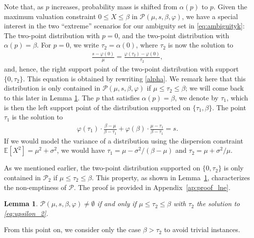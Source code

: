 \documentclass[11pt]{article}
\newtheorem{lemma}{Lemma}[section]
\newcommand{\cP}{\mathcal{P}}
\newcommand{\cPpar}{\mathcal{P}(\mu,s,\beta,\varphi)}
\newcommand{\1}{\mathds{1}}
\begin{document}
Note that, as $p$ increases, probability mass is shifted from $\alpha(p)$ to $p$.
Given the maximum valuation constraint $0 \leq X \leq \beta$ in $\cPpar$, we have a special interest in the two ``extreme''  scenarios for our ambiguity set in \eqref{eq:ambiguityk}: The two-point distribution with $p = 0$, and the two-point distribution with $\alpha(p) = \beta$.
For $p = 0$, we write $\tau_2 = \alpha(0)$, where $\tau_2$ is now the solution to 
\begin{align}
        \frac{s- \varphi(0)}{\mu} = \frac{\varphi(\tau_2)-\varphi(0)}{\tau_2},
        \label{eq:upsilon_2}
\end{align}
and, hence, the right support point of the two-point distribution with support $\{0,\tau_2\}$. This equation is obtained by rewriting \eqref{alpha}. We remark here that this distribution is only contained in $\cPpar$ if $\mu \leq \tau_2 \leq \beta$; we will come back to this later in Lemma \ref{lemma:non-empty}. The $p$ that satisfies $\alpha(p) = \beta$, we denote by $\tau_1$, which is then the left support point of the distribution supported on $\{\tau_1,\beta\}$. The point $\tau_1$ is the solution to
\begin{align}
    \varphi(\tau_1)\cdot \frac{\beta-\mu}{\beta-\tau_1} + \varphi(\beta)\cdot \frac{\mu - \tau_1}{\beta - \tau_1} = s.
    \label{eq:upsilon_1}
\end{align}
If we would model the variance of a distribution using the dispersion constraint $\mathbb{E}[X^2] = \mu^2 + \sigma^2$, we would have  $\tau_1 = \mu - \sigma^2/(\beta - \mu)$ and $\tau_2 = \mu + \sigma^2/\mu$. 

As we mentioned earlier, the two-point distribution supported on $\{0,\tau_2\}$ is only contained in $\mathcal{P}_2$ if $\mu \leq \tau_2 \leq \beta$. This property, as shown in Lemma~\ref{lemma:non-empty}, characterizes the non-emptiness of $\cP$. The proof is provided in Appendix~\ref{ap:proof_lne}.

\begin{lemma}\label{lemma:non-empty}
    $\cPpar \neq \emptyset$ if and only if $\mu \leq \tau_2 \leq \beta$ with $\tau_2$ the solution to \eqref{eq:upsilon_2}.
\end{lemma}

\noindent From this point on, we consider only the case $\beta > \tau_2$ to avoid trivial instances.
\end{document}
